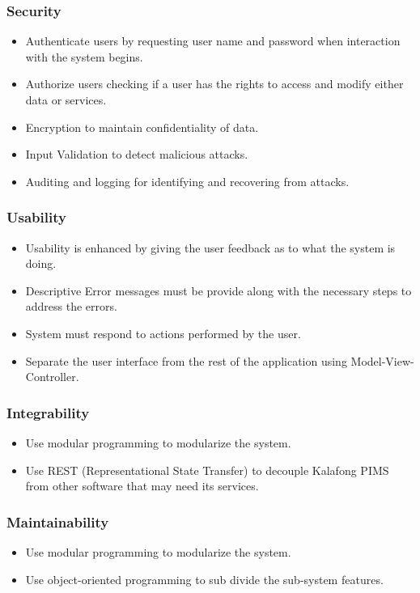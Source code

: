 \subsubsection{Security}
	\begin{itemize}
		\item Authenticate users by requesting user name and password when interaction with the system begins.
		\item Authorize users checking if a user has the rights to access and modify either data or services.
		\item Encryption to maintain confidentiality of data.
		\item Input Validation to detect malicious attacks.
		\item Auditing and logging for identifying and recovering from attacks.
	\end{itemize}	
\subsubsection{Usability}
	\begin{itemize}
		\item Usability is enhanced by giving the user feedback as to what the system is doing.
		\item Descriptive Error messages must be provide along with the necessary steps to address the errors.
		\item System must respond to actions performed by the user.
		\item Separate the user interface from the rest of the application using Model-View-Controller.
	\end{itemize}
\subsubsection{Integrability}
	\begin{itemize}
		\item Use modular programming to modularize the system. 
		\item Use REST (Representational State Transfer) to decouple Kalafong PIMS from other software that may need its services.
	\end{itemize}
\subsubsection{Maintainability}
	\begin{itemize}
		\item Use modular programming to modularize the system.
		\item Use object-oriented programming to sub divide the sub-system features.
	\end{itemize}
